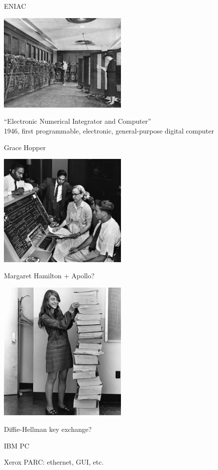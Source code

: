 \documentclass[xcolor={usenames,dvipsnames,svgnames,table},12pt]{beamer}
\begin{document}
\begin{frame}{ENIAC}
  \begin{center}
    \includegraphics[width=2.5in]{Eniac}
  \end{center}

  ``Electronic Numerical Integrator and Computer'' \\
  1946, first programmable, electronic, general-purpose digital computer
\end{frame}

\begin{frame}{Grace Hopper}
  \begin{center}
    \includegraphics[width=2.5in]{Grace_Hopper_and_UNIVAC}
  \end{center}
\end{frame}

\begin{frame}{Margaret Hamilton + Apollo?}
  \begin{center}
    \includegraphics[width=2.5in]{hamilton1}
  \end{center}
\end{frame}

\begin{frame}{Diffie-Hellman key exchange?}

\end{frame}

\begin{frame}{IBM PC}

\end{frame}

\begin{frame}{Xerox PARC: ethernet, GUI, etc.}

\end{frame}
\end{document}
